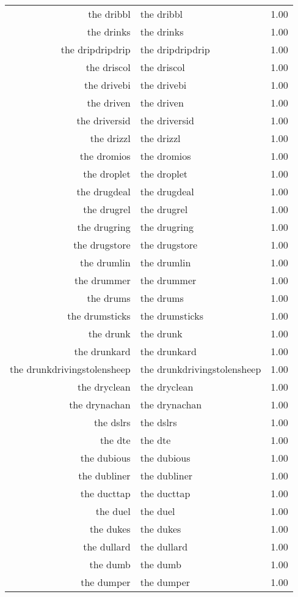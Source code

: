 \begin{table}[ht]
\begin{tabular}{rlr}
  the dribbl & the dribbl & 1.00 \\ 
  the drinks & the drinks & 1.00 \\ 
  the dripdripdrip & the dripdripdrip & 1.00 \\ 
  the driscol & the driscol & 1.00 \\ 
  the drivebi & the drivebi & 1.00 \\ 
  the driven & the driven & 1.00 \\ 
  the driversid & the driversid & 1.00 \\ 
  the drizzl & the drizzl & 1.00 \\ 
  the dromios & the dromios & 1.00 \\ 
  the droplet & the droplet & 1.00 \\ 
  the drugdeal & the drugdeal & 1.00 \\ 
  the drugrel & the drugrel & 1.00 \\ 
  the drugring & the drugring & 1.00 \\ 
  the drugstore & the drugstore & 1.00 \\ 
  the drumlin & the drumlin & 1.00 \\ 
  the drummer & the drummer & 1.00 \\ 
  the drums & the drums & 1.00 \\ 
  the drumsticks & the drumsticks & 1.00 \\ 
  the drunk & the drunk & 1.00 \\ 
  the drunkard & the drunkard & 1.00 \\ 
  the drunkdrivingstolensheep & the drunkdrivingstolensheep & 1.00 \\ 
  the dryclean & the dryclean & 1.00 \\ 
  the drynachan & the drynachan & 1.00 \\ 
  the dslrs & the dslrs & 1.00 \\ 
  the dte & the dte & 1.00 \\ 
  the dubious & the dubious & 1.00 \\ 
  the dubliner & the dubliner & 1.00 \\ 
  the ducttap & the ducttap & 1.00 \\ 
  the duel & the duel & 1.00 \\ 
  the dukes & the dukes & 1.00 \\ 
  the dullard & the dullard & 1.00 \\ 
  the dumb & the dumb & 1.00 \\ 
  the dumper & the dumper & 1.00 \\ 

\end{tabular}
\end{table}
